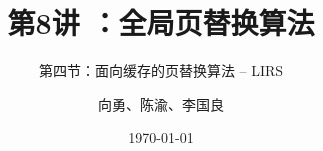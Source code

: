 



\title[第8讲]{第8讲 ：全局页替换算法} %
\subtitle{第四节：面向缓存的页替换算法 -- LIRS}
\author{向勇、陈渝、李国良} %
\date{\today} %




\begin{frame}
\titlepage %
\end{frame}

